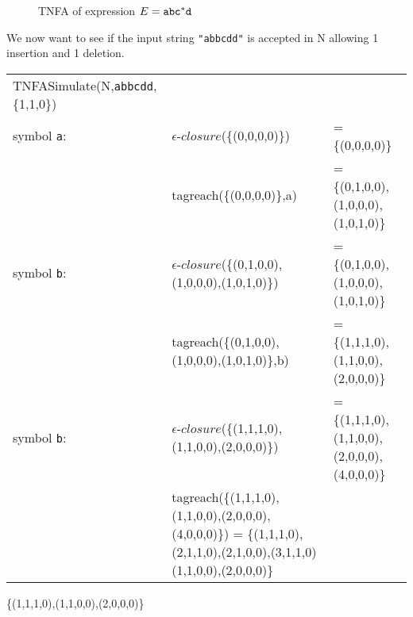 \begin{myex}
\begin{figure}[h!]
\begin{center}
\end{center}
\caption{TNFA of expression $E = {\tt abc}^*{\tt d}$}
\label{tnfa:simsuc}
\end{figure}
We now want to see if the input string {\tt "abbcdd"} is accepted in N allowing 1 insertion and 1 deletion.
\begin{tabular}{l l l}
TNFASimulate(N,{\tt abbcdd},\{1,1,0\}) & & \\
symbol {\tt a}:& $\epsilon$-$closure$(\{(0,0,0,0)\}) & = \{(0,0,0,0)\}\\
& tagreach(\{(0,0,0,0)\},a) & = \{(0,1,0,0),(1,0,0,0),(1,0,1,0)\}\\
symbol {\tt b}:& $\epsilon$-$closure$(\{(0,1,0,0),(1,0,0,0),(1,0,1,0)\}) & = \{(0,1,0,0),(1,0,0,0),(1,0,1,0)\}\\
& tagreach(\{(0,1,0,0),(1,0,0,0),(1,0,1,0)\},b) & = \{(1,1,1,0),(1,1,0,0),(2,0,0,0)\}\\
symbol {\tt b}:& $\epsilon$-$closure$(\{(1,1,1,0),(1,1,0,0),(2,0,0,0)\}) &= \{(1,1,1,0),(1,1,0,0),(2,0,0,0),(4,0,0,0)\}\\
& tagreach(\{(1,1,1,0),(1,1,0,0),(2,0,0,0),(4,0,0,0)\}) = \{(1,1,1,0),(2,1,1,0),(2,1,0,0),(3,1,1,0)
(1,1,0,0),(2,0,0,0)\}
\end{tabular}
\end{myex}
\{(1,1,1,0),(1,1,0,0),(2,0,0,0)\}